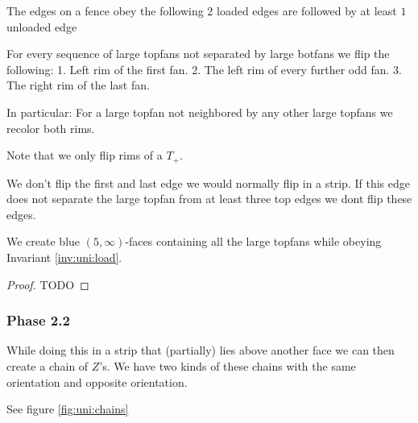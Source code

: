     \begin{invariants}
      \label{inv:uni:load}
      \item The edges on a fence obey the following $2$ loaded edges are followed by at least $1$ unloaded edge
    \end{invariants}

    For every sequence of large topfans not separated by large botfans we flip the following:
    1. Left rim of the first fan.
    2. The left rim of every further odd fan.
    3. The right rim of the last fan.

    In particular: For a large topfan not neighbored by any other large topfans we recolor both rims.

    Note that we only flip rims of a $T_+$.

    We don't flip the first and last edge we would normally flip in a strip. If this edge does not separate the large topfan from at least three top edges we dont flip these edges.

    \begin{lemma}
      \label{lm:uni:removingLargeB-fans}
      We create blue $(5, \infty)$-faces containing all the large topfans while obeying Invariant \ref{inv:uni:load}.
    \end{lemma}
    \begin{proof}
      TODO 
    \end{proof}

  \subsubsection{Phase 2.2}
    While doing this in a strip that (partially) lies above another face we can then create a chain of $Z$'s. We have two kinds of these chains with the same orientation and opposite orientation.

    See figure \ref{fig:uni:chains}

